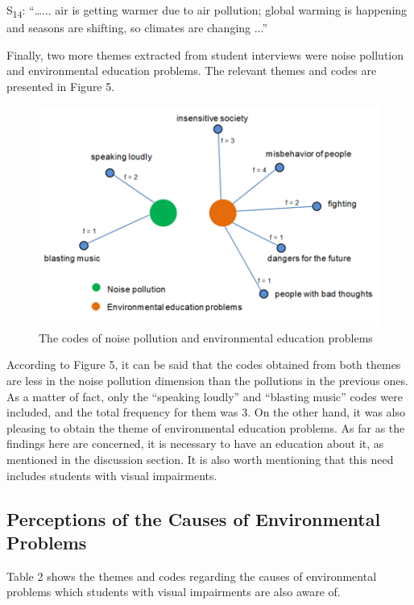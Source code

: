 \documentclass[11.5pt]{sig-alternate} %
\begin{document}
\begin{large}
S\textsubscript{14}: “…... air is getting warmer due to air pollution; global warming is happening and seasons are shifting, so climates are changing ...”

Finally, two more themes extracted from student interviews were noise pollution and environmental education problems. The relevant themes and codes are presented in Figure 5.
 
\begin{figure}[h]
    \centering
    \includegraphics[width=1\linewidth]{Fig5.png}
    \caption{The codes of noise pollution and environmental education problems}
\end{figure}

According to Figure 5, it can be said that the codes obtained from both themes are less in the noise pollution dimension than the pollutions in the previous ones. As a matter of fact, only the “speaking loudly” and “blasting music” codes were included, and the total frequency for them was 3. On the other hand, it was also pleasing to obtain the theme of environmental education problems. As far as the findings here are concerned, it is necessary to have an education about it, as mentioned in the discussion section. It is also worth mentioning that this need includes students with visual impairments. 

\subsection*{Perceptions of the Causes of Environmental Problems}

Table 2 shows the themes and codes regarding the causes of environmental problems which students with visual impairments are also aware of.


\end{large}
\end{document}
